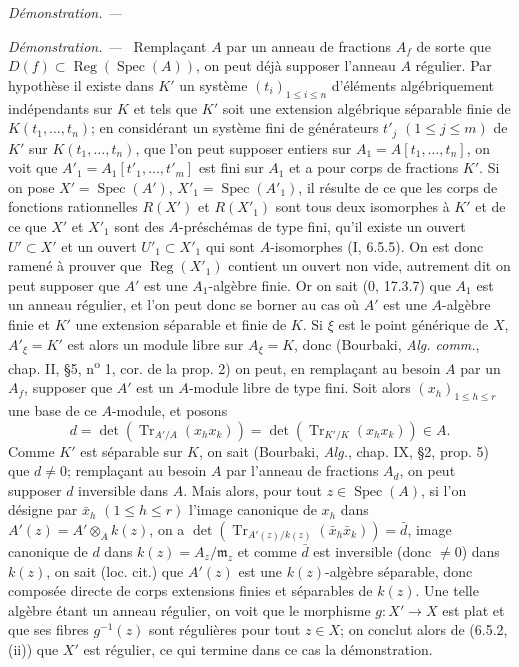 \documentclass[10pt,oneside]{book}
\newcommand{\oldpage}[2][]{%
  \setcounter{footnote}{0}%
  \marginpar{\scriptsize\textbf{#1}~|~#2}\ignorespaces}
\newenvironment{proof}{%
  \par\medskip\noindent\textit{Démonstration. ---\ }}{\par}
\begin{document}
\begin{proof}
\begin{proof}
Remplaçant $A$ par un anneau de fractions $A_f$ de sorte que
$D(f)\subset\operatorname{Reg}(\operatorname{Spec}(A))$, on peut déjà
supposer l'anneau $A$ régulier. Par hypothèse il existe dans $K'$ un système
$(t_i)_{1\leq i\leq n}$ d'éléments algébriquement indépendants sur $K$ et
tels que $K'$ soit une extension algébrique séparable finie de
$K(t_1,\ldots,t_n)$; en considérant un système fini
\oldpage[IV-2]{165}
de générateurs $t'_j$ $(1\leq j\leq m)$ de $K'$ sur
$K(t_1,\ldots,t_n)$, que l'on peut supposer entiers sur
$A_1=A[t_1,\ldots,t_n]$, on voit que
$A'_1=A_1[t'_1,\ldots,t'_m]$ est fini sur $A_1$ et a pour corps de fractions
$K'$. Si on pose $X'=\operatorname{Spec}(A')$,
$X'_1=\operatorname{Spec}(A'_1)$, il résulte de ce que les corps de fonctions
rationnelles $R(X')$ et $R(X'_1)$ sont tous deux isomorphes à $K'$ et de ce
que $X'$ et $X'_1$ sont des $A$-préschémas de type fini, qu'il existe un
ouvert $U'\subset X'$ et un ouvert $U'_1\subset X'_1$ qui sont
$A$-isomorphes (I, 6.5.5). On est donc ramené à prouver que
$\operatorname{Reg}(X'_1)$ contient un ouvert non vide, autrement dit on
peut supposer que $A'$ est une $A_1$-algèbre finie. Or on sait (0, 17.3.7)
que $A_1$ est un anneau régulier, et l'on peut donc se borner au cas où $A'$
est une $A$-algèbre finie et $K'$ une extension séparable et finie de $K$.
Si $\xi$ est le point générique de $X$, $A'_\xi=K'$ est alors un module
libre sur $A_\xi=K$, donc (Bourbaki, \emph{Alg. comm.}, chap. II, \S5,
n\textsuperscript{o} 1,
cor. de la prop. 2) on peut, en remplaçant au besoin $A$ par un $A_f$,
supposer que $A'$ est un $A$-module libre de type fini. Soit alors
$(x_h)_{1\leq h\leq r}$ une base de ce $A$-module, et posons
\[
d=\det(\operatorname{Tr}_{A'/A}(x_hx_k))=
\det(\operatorname{Tr}_{K'/K}(x_hx_k))\in A.
\]
Comme $K'$ est séparable sur $K$, on sait (Bourbaki, \emph{Alg.}, chap. IX, \S2,
prop. 5) que $d\neq0$; remplaçant au besoin $A$ par l'anneau de fractions
$A_d$, on peut supposer $d$ inversible dans $A$. Mais alors, pour tout
$z\in\operatorname{Spec}(A)$, si l'on désigne par $\bar x_h$
$(1\leq h\leq r)$ l'image canonique de $x_h$ dans
$A'(z)=A'\otimes_A k(z)$, on a
$\det(\operatorname{Tr}_{A'(z)/k(z)}(\bar x_h\bar x_k))=\bar d$, image
canonique de $d$ dans $k(z)=A_z/\mathfrak m_z$ et comme $\bar d$ est
inversible (donc $\neq0$) dans $k(z)$, on sait (loc. cit.) que $A'(z)$ est
une $k(z)$-algèbre séparable, donc composée directe de corps extensions
finies et séparables de $k(z)$. Une telle algèbre étant un anneau régulier,
on voit que le morphisme $g:X'\to X$ est plat et que ses fibres $g^{-1}(z)$
sont régulières pour tout $z\in X$; on conclut alors de (6.5.2, (ii)) que
$X'$ est régulier, ce qui termine dans ce cas la démonstration.
\end{proof}


\end{proof}
\end{document}
